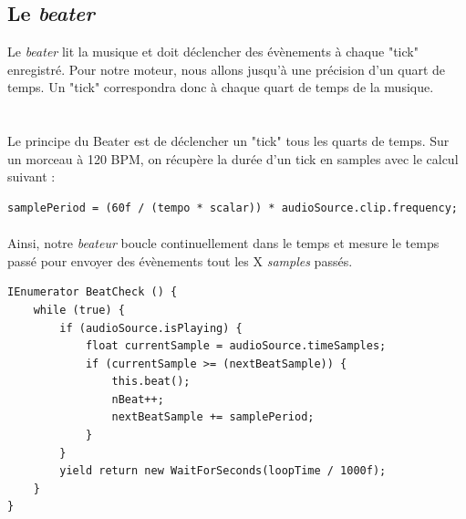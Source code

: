 \subsection{Le \textit{beater}}
Le \textit{beater} lit la musique et doit déclencher des évènements à chaque "tick" enregistré. Pour notre moteur, nous allons jusqu'à une précision d'un quart de temps. Un "tick" correspondra donc à chaque quart de temps de la musique.\\

\\\\

Le principe du Beater est de déclencher un "tick" tous les quarts de temps. Sur un morceau à 120 BPM, on récupère la durée d’un tick en samples avec le calcul suivant :

\begin{lstlisting}
samplePeriod = (60f / (tempo * scalar)) * audioSource.clip.frequency;
\end{lstlisting}

\paragraph{}

Ainsi, notre \textit{beateur} boucle continuellement dans le temps et mesure le temps passé pour envoyer des évènements tout les X \textit{samples} passés.

\begin{lstlisting}
IEnumerator BeatCheck () {
    while (true) {
        if (audioSource.isPlaying) {
            float currentSample = audioSource.timeSamples;
            if (currentSample >= (nextBeatSample)) {
                this.beat();
                nBeat++;
                nextBeatSample += samplePeriod;
            }
        }
        yield return new WaitForSeconds(loopTime / 1000f);
    }
}
\end{lstlisting}

